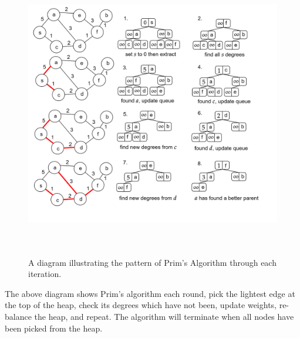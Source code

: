 \begin{figure}[h]
\centering

        




\includegraphics[height=5in]{./Sections/spanning/prims_alg.png}

        \caption{A diagram illustrating the pattern of Prim's Algorithm through each iteration.}
        \label{fig:prim_example}
    \end{figure}



\noindent
The above diagram shows Prim's algorithm each round, pick the lightest edge at the top of the heap, check its degrees which have not been, 
update weights, re-balance the heap, and repeat. The algorithm will terminate when all nodes have been picked from the heap.\\ 

